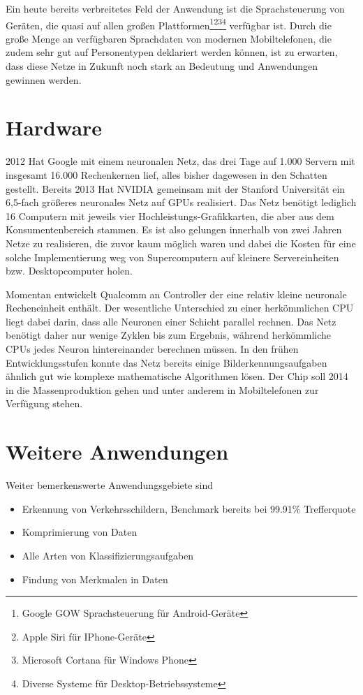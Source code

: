 Ein heute bereits verbreitetes Feld der Anwendung ist die Sprachsteuerung von Geräten, die quasi auf allen großen Plattformen\footnote{Google GOW Sprachsteuerung für Android-Geräte}\footnote{Apple Siri für IPhone-Geräte}\footnote{Microsoft Cortana für Windows Phone}\footnote{Diverse Systeme für Desktop-Betriebssysteme} verfügbar ist. Durch die große Menge an verfügbaren Sprachdaten von modernen Mobiltelefonen, die zudem sehr gut auf Personentypen deklariert werden können, ist zu erwarten, dass diese Netze in Zukunft noch stark an Bedeutung und Anwendungen gewinnen werden.

\section{Hardware}

2012 Hat Google mit einem neuronalen Netz, das drei Tage auf 1.000 Servern mit insgesamt 16.000 Rechenkernen lief, alles bisher dagewesen in den Schatten gestellt. Bereits 2013 Hat NVIDIA gemeinsam mit der Stanford Universität \citep{nvidia} ein 6,5-fach größeres neuronales Netz auf GPUs realisiert. Das Netz benötigt lediglich 16 Computern mit jeweils vier Hochleistungs-Grafikkarten, die aber aus dem Konsumentenbereich stammen. Es ist also gelungen innerhalb von zwei Jahren Netze zu realisieren, die zuvor kaum möglich waren und dabei die Kosten für eine solche Implementierung weg von Supercomputern auf kleinere Servereinheiten bzw. Desktopcomputer holen.

Momentan entwickelt Qualcomm an Controller der eine relativ kleine neuronale Recheneinheit enthält. Der wesentliche Unterschied zu einer herkömmlichen CPU liegt dabei darin, dass alle Neuronen einer Schicht parallel rechnen. Das Netz benötigt daher nur wenige Zyklen bis zum Ergebnis, während herkömmliche CPUs jedes Neuron hintereinander berechnen müssen. In den frühen Entwicklungsstufen konnte das Netz bereits einige Bilderkennungsaufgaben ähnlich gut wie komplexe mathematische Algorithmen lösen. Der Chip soll 2014 in die Massenproduktion gehen und unter anderem in Mobiltelefonen zur Verfügung stehen.

\section{Weitere Anwendungen}

Weiter bemerkenswerte Anwendungsgebiete sind

\begin{itemize}
\item Erkennung von Verkehrsschildern, Benchmark bereits bei 99.91\% Trefferquote \citep{trafficsign}
\item Komprimierung von Daten
\item Alle Arten von Klassifizierungsaufgaben
\item Findung von Merkmalen in Daten
\end{itemize}

